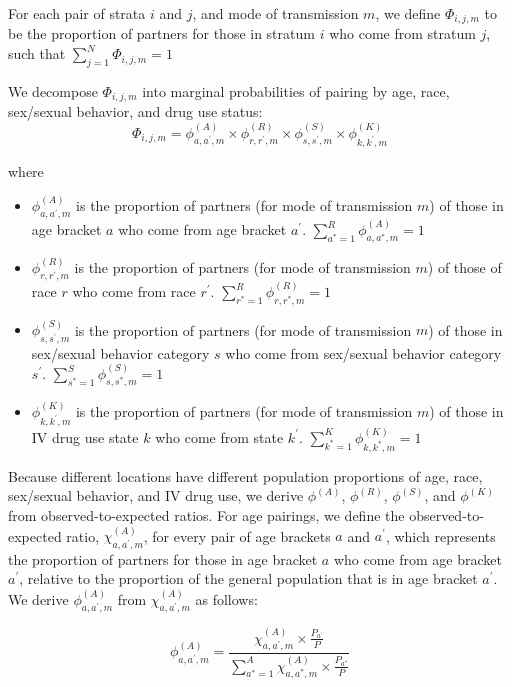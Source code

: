 \documentclass{article}
\begin{document}
For each pair of strata $i$ and $j$, and mode of transmission $m$, we define $\Phi_{i,j,m}$ to be the proportion of partners for those in stratum $i$ who come from stratum $j$, such that $\sum_{j=1}^N \Phi_{i,j,m} = 1$

We decompose $\Phi_{i,j,m}$ into marginal probabilities of pairing by age, race, sex/sexual behavior, and drug use status:
\begin{equation}
\Phi_{i,j,m} = \phi^{(A)}_{a,a^\prime,m} \times \phi^{(R)}_{r,r^\prime,m} \times \phi^{(S)}_{s,s^\prime,m} \times \phi^{(K)}_{k,k^\prime,m}
\end{equation}

where 
\begin{itemize}
	\item $\phi^{(A)}_{a,a^\prime,m}$ is the proportion of partners (for mode of transmission $m$) of those in age bracket $a$ who come from age bracket $a^\prime$. $\sum_{a^*=1}^R \phi^{(A)}_{a,a^*,m} = 1$
	\item $\phi^{(R)}_{r,r^\prime,m}$ is the proportion of partners (for mode of transmission $m$) of those of race $r$ who come from race $r^\prime$. \newline$\sum_{r^*=1}^R \phi^{(R)}_{r,r^*,m} = 1$
	\item $\phi^{(S)}_{s,s^\prime,m}$ is the proportion of partners (for mode of transmission $m$) of those in sex/sexual behavior category $s$ who come from sex/sexual behavior category $s^\prime$. $\sum_{s^*=1}^S \phi^{(S)}_{s,s^*,m} = 1$
	\item $\phi^{(K)}_{k,k^\prime,m}$ is the proportion of partners (for mode of transmission $m$) of those in IV drug use state $k$ who come from state $k^\prime$. $\sum_{k^*=1}^K \phi^{(K)}_{k,k^*,m} = 1$
\end{itemize}

Because different locations have different population proportions of age, race, sex/sexual behavior, and IV drug use, we derive $\phi^{(A)}$, $\phi^{(R)}$, $\phi^{(S)}$, and $\phi^{(K)}$ from observed-to-expected ratios. For age pairings, we define the observed-to-expected ratio, $\chi^{(A)}_{a,a^\prime,m}$, for every pair of age brackets $a$ and $a^\prime$, which represents the proportion of partners for those in age bracket $a$ who come from age bracket $a^\prime$, relative to the proportion of the general population that is in age bracket $a^\prime$. We derive $\phi^{(A)}_{a,a^\prime,m}$ from $\chi^{(A)}_{a,a^\prime,m}$ as follows:

\begin{equation}
\phi^{(A)}_{a,a^\prime,m} = \frac{\chi^{(A)}_{a,a^\prime,m} \times \frac{P_{a^\prime}}{P}}{\sum_{a^*=1}^A \chi^{(A)}_{a,a^*,m} \times \frac{P_{a^*}}{P}}
\end{equation}
\end{document}
